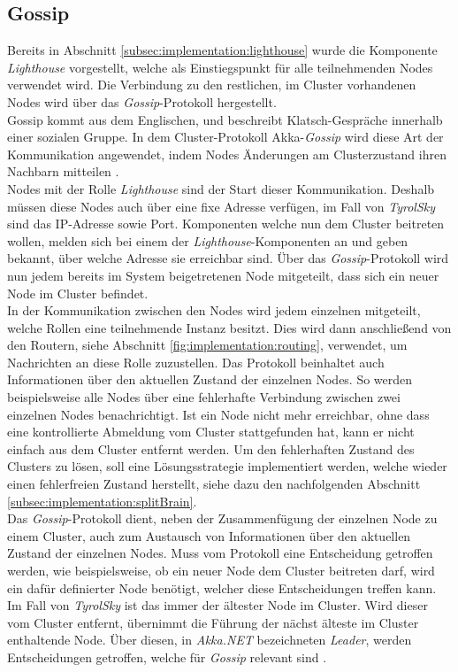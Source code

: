 \subsection{Gossip}
\label{subsec:implementation:gossip}
Bereits in Abschnitt \ref{subsec:implementation:lighthouse} wurde die Komponente \textit{Lighthouse} vorgestellt, welche als Einstiegspunkt für alle teilnehmenden Nodes verwendet wird. Die Verbindung zu den restlichen, im Cluster vorhandenen Nodes wird über das \textit{Gossip}-Protokoll hergestellt. \\
Gossip kommt aus dem Englischen, und beschreibt Klatsch-Gespräche innerhalb einer sozialen Gruppe. 
In dem Cluster-Protokoll Akka-\textit{Gossip} wird diese Art der Kommunikation angewendet, indem Nodes Änderungen am Clusterzustand ihren Nachbarn mitteilen \citep{Akka.NETCommunityAkka.NETDocumentation}. \\
Nodes mit der Rolle \textit{Lighthouse} sind der Start dieser Kommunikation. Deshalb müssen diese Nodes auch über eine fixe Adresse verfügen, im Fall von \textit{TyrolSky} sind das IP-Adresse sowie Port. Komponenten welche nun dem Cluster beitreten wollen, melden sich bei einem der \textit{Lighthouse}-Komponenten an und geben bekannt, über welche Adresse sie erreichbar sind. Über das \textit{Gossip}-Protokoll wird nun jedem bereits im System beigetretenen Node mitgeteilt, dass sich ein neuer Node im Cluster befindet. \\
In der Kommunikation zwischen den Nodes wird jedem einzelnen mitgeteilt, welche Rollen eine teilnehmende Instanz besitzt. Dies wird dann anschließend von den Routern, siehe Abschnitt \ref{fig:implementation:routing}, verwendet, um Nachrichten an diese Rolle zuzustellen. Das Protokoll beinhaltet auch Informationen über den aktuellen Zustand der einzelnen Nodes. So werden beispielsweise alle Nodes über eine fehlerhafte Verbindung zwischen zwei einzelnen Nodes benachrichtigt. Ist ein Node nicht mehr erreichbar, ohne dass eine kontrollierte Abmeldung vom Cluster stattgefunden hat, kann er nicht einfach aus dem Cluster entfernt werden. Um den fehlerhaften Zustand des Clusters zu lösen, soll eine Lösungsstrategie implementiert werden, welche wieder einen fehlerfreien Zustand herstellt, siehe dazu den nachfolgenden Abschnitt \ref{subsec:implementation:splitBrain}. \\ 
Das \textit{Gossip}-Protokoll dient, neben der Zusammenfügung der einzelnen Node zu einem Cluster, auch zum Austausch von Informationen über den aktuellen Zustand der einzelnen Nodes. Muss vom Protokoll eine Entscheidung getroffen werden, wie beispielsweise, ob ein neuer Node dem Cluster beitreten darf, wird ein dafür definierter Node benötigt, welcher diese Entscheidungen treffen kann. Im Fall von \textit{TyrolSky} ist das immer der ältester Node im Cluster. Wird dieser vom Cluster entfernt, übernimmt die Führung der nächst älteste im Cluster enthaltende Node. Über diesen, in \textit{Akka.NET} bezeichneten \textit{Leader}, werden Entscheidungen getroffen, welche für \textit{Gossip} relevant sind \citep{akkaInAction}. 

